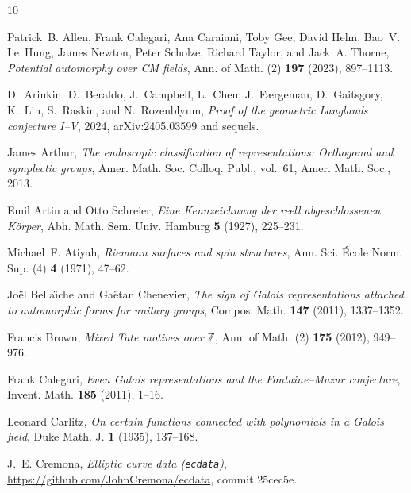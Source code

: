\documentclass[11pt]{amsart}
\numberwithin{equation}{section}
\begin{document}
\providecommand{\bysame}{\leavevmode\hbox to3em{\hrulefill}\thinspace}
\providecommand{\MR}{\relax\ifhmode\unskip\space\fi MR }
\providecommand{\MRhref}[2]{%
  \href{http://www.ams.org/mathscinet-getitem?mr=#1}{#2}
}
\providecommand{\href}[2]{#2}
\begin{thebibliography}{10}

Patrick~B. Allen, Frank Calegari, Ana Caraiani, Toby Gee, David Helm, Bao~V.
  Le~Hung, James Newton, Peter Scholze, Richard Taylor, and Jack~A. Thorne,
  \emph{Potential automorphy over {CM} fields}, Ann. of Math. (2) \textbf{197}
  (2023), 897--1113.

D.~Arinkin, D.~Beraldo, J.~Campbell, L.~Chen, J.~F{\ae}rgeman, D.~Gaitsgory,
  K.~Lin, S.~Raskin, and N.~Rozenblyum, \emph{Proof of the geometric
  {L}anglands conjecture {I}--{V}}, 2024, arXiv:2405.03599 and sequels.

James Arthur, \emph{The endoscopic classification of representations:
  Orthogonal and symplectic groups}, Amer. Math. Soc. Colloq. Publ., vol.~61,
  Amer. Math. Soc., 2013.

Emil Artin and Otto Schreier, \emph{Eine {K}ennzeichnung der reell
  abgeschlossenen {K}{\"o}rper}, Abh. Math. Sem. Univ. Hamburg \textbf{5}
  (1927), 225--231.

Michael~F. Atiyah, \emph{Riemann surfaces and spin structures}, Ann. Sci.
  {\'E}cole Norm. Sup. (4) \textbf{4} (1971), 47--62.

Jo{\"e}l Bella{\"\i}che and Ga{\"e}tan Chenevier, \emph{The sign of {G}alois
  representations attached to automorphic forms for unitary groups}, Compos.
  Math. \textbf{147} (2011), 1337--1352.

Francis Brown, \emph{Mixed {T}ate motives over {$\mathbb Z$}}, Ann. of Math.
  (2) \textbf{175} (2012), 949--976.

Frank Calegari, \emph{Even {G}alois representations and the {F}ontaine--{M}azur
  conjecture}, Invent. Math. \textbf{185} (2011), 1--16.

Leonard Carlitz, \emph{On certain functions connected with polynomials in a
  {G}alois field}, Duke Math. J. \textbf{1} (1935), 137--168.

J.~E. Cremona, \emph{Elliptic curve data ({\tt ecdata})},
  \url{https://github.com/JohnCremona/ecdata}, commit 25cec5e.


\end{thebibliography}
\end{document}
